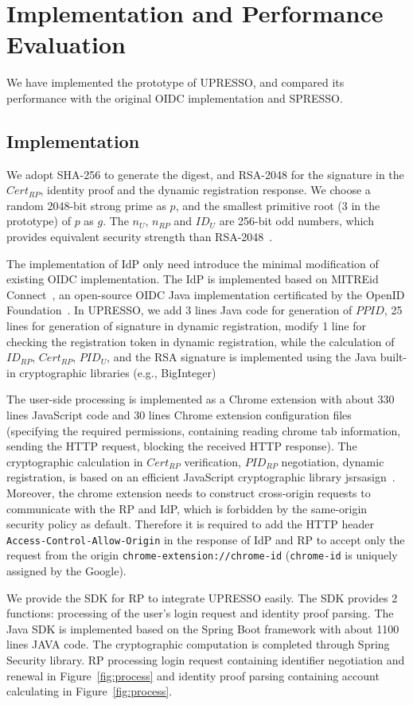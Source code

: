 \section{Implementation and Performance Evaluation}
\label{sec:implementation}
We have implemented the prototype of UPRESSO, and compared its performance with the original OIDC implementation and SPRESSO.

\subsection{Implementation}
We adopt SHA-256 to generate the digest, and  RSA-2048 for the signature in  the $Cert_{RP}$, identity proof and the dynamic registration response. We  choose a random 2048-bit strong prime as $p$, and the smallest primitive root (3 in the prototype)  of $p$ as $g$. The  $n_U$, $n_{RP}$ and $ID_U$  are 256-bit odd numbers, which provides equivalent security strength than RSA-2048~\cite{barkerecommendation}.

The implementation of IdP only need introduce the minimal modification of existing OIDC implementation. The IdP is implemented based on MITREid Connect~\cite{MITREid}, an open-source OIDC Java implementation certificated by the OpenID Foundation~\cite{OIDF}. 
In UPRESSO, we add 3 lines Java code for generation of $PPID$, 25 lines for generation of signature in dynamic registration, modify 1 line for checking the registration token in dynamic registration, while the calculation of $ID_{RP}$, $Cert_{RP}$,  $PID_U$, and the RSA signature is implemented using the Java built-in cryptographic libraries (e.g., BigInteger)

The user-side processing is implemented as a Chrome extension with about 330 lines JavaScript code and 30 lines  Chrome extension configuration files (specifying the required permissions, containing reading chrome tab information, sending the HTTP request, blocking the received HTTP response). The cryptographic calculation in $Cert_{RP}$ verification, $PID_{RP}$ negotiation, dynamic registration, is based on an efficient JavaScript cryptographic library  jsrsasign~\cite{jsrsasign}. 
Moreover, the chrome extension needs to construct cross-origin requests to communicate with the RP and IdP, which is forbidden by the same-origin security policy as default. Therefore it is required to add the HTTP header \verb+Access-Control-Allow-Origin+ in the response of IdP and RP to accept only the request from the origin \verb+chrome-extension://chrome-id+ (\verb+chrome-id+ is uniquely assigned by the Google).

We provide the SDK for RP to integrate UPRESSO easily. The SDK provides 2 functions: 
processing of the user's login request and  identity proof parsing. The Java SDK is implemented based on the Spring Boot framework  with about 1100 lines JAVA code. The cryptographic computation is completed through Spring Security library.
RP processing login request containing identifier negotiation and renewal in Figure~\ref{fig:process} and identity proof parsing containing account calculating in Figure~\ref{fig:process}.


